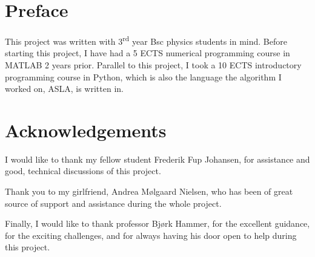 \chapter*{Preface}

This project was written with 3\textsuperscript{rd} year Bsc physics students in mind. Before starting this project, I have had a 5 ECTS numerical programming course in MATLAB 2 years prior. Parallel to this project, I took a 10 ECTS introductory programming course in Python, which is also the language the algorithm I worked on, ASLA, is written in. 

\chapter*{Acknowledgements}

I would like to thank my fellow student Frederik Fup Johansen, for assistance and good, technical discussions of this project. 

Thank you to my girlfriend, Andrea Mølgaard Nielsen, who has been of great source of support and assistance during the whole project.  

Finally, I would like to thank professor Bjørk Hammer, for the excellent guidance, for the exciting challenges, and for always having his door open to help during this project.

\newpage